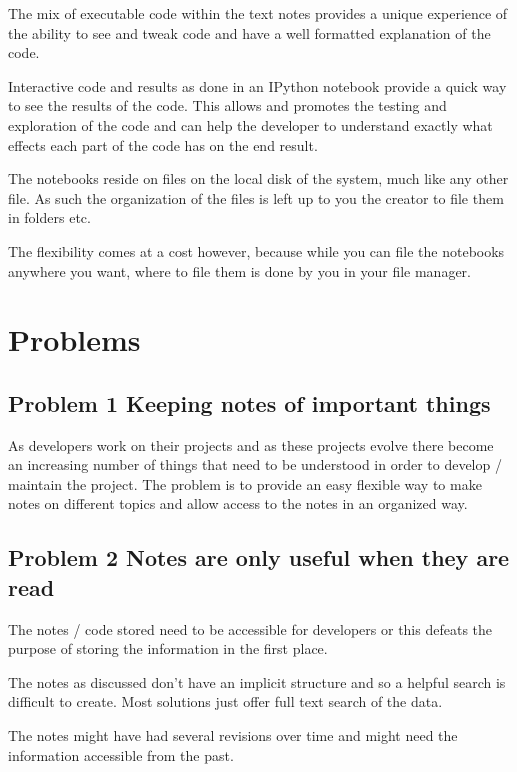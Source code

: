 The mix of executable code within the text notes provides a unique
experience of the ability to see and tweak code and have a well
formatted explanation of the code.

Interactive code and results as done in an IPython notebook provide a
quick way to see the results of the code. This allows and promotes the
testing and exploration of the code and can help the developer to
understand exactly what effects each part of the code has on the end
result.

The notebooks reside on files on the local disk of the system, much like
any other file. As such the organization of the files is left up to you
the creator to file them in folders etc.

The flexibility comes at a cost however, because while you can file the
notebooks anywhere you want, where to file them is done by you in your
file manager.

\section{Problems}\label{problems}

\subsection{Problem 1 Keeping notes of important
things}\label{problem-1-keeping-notes-of-important-things}

As developers work on their projects and as these projects evolve there
become an increasing number of things that need to be understood in
order to develop / maintain the project. The problem is to provide an
easy flexible way to make notes on different topics and allow access to
the notes in an organized way.

\subsection{Problem 2 Notes are only useful when they are
read}\label{problem-2-notes-are-only-useful-when-they-are-read}

The notes / code stored need to be accessible for developers or this
defeats the purpose of storing the information in the first place.

The notes as discussed don't have an implicit structure and so a helpful
search is difficult to create. Most solutions just offer full text
search of the data.

The notes might have had several revisions over time and might need the
information accessible from the past.

